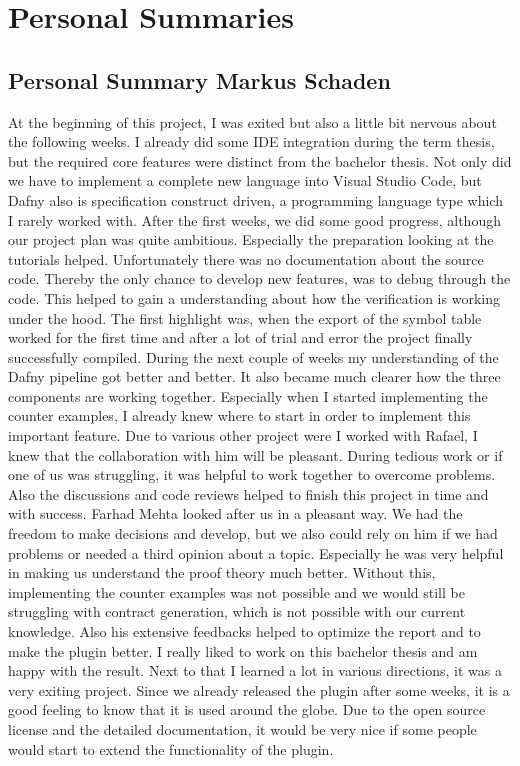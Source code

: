 \section{Personal Summaries}

\subsection{Personal Summary Markus Schaden}
At the beginning of this project, I was exited but also a little bit nervous about the following weeks. I already did some IDE integration during the term thesis, but the required core features were distinct from the bachelor thesis. Not only did we have to implement a complete new language into Visual Studio Code, but Dafny also is specification construct driven, a programming language type which I rarely worked with. \newline
After the first weeks, we did some good progress, although our project plan was quite ambitious. Especially the preparation looking at the tutorials helped. Unfortunately there was no documentation about the source code. Thereby the only chance to develop new features, was to debug through the code. This helped to gain a understanding about how the verification is working under the hood. The first highlight was, when the export of the symbol table worked for the first time and after a lot of trial and error the project finally successfully compiled.  \newline
During the next couple of weeks my understanding of the Dafny pipeline got better and better. It also became much clearer how the three components are working together. Especially when I started implementing the counter examples, I already knew where to start in order to implement this important feature.  \newline
Due to various other project were I worked with Rafael, I knew that the collaboration with him will be pleasant. During tedious work or if one of us was struggling, it was helpful to work together to overcome problems. Also the discussions and code reviews helped to finish this project in time and with success.   \newline
Farhad Mehta looked after us in a pleasant way. We had the freedom to make decisions and develop, but we also could rely on him if we had problems or needed a third opinion about a topic. Especially he was very helpful in making us understand the proof theory much better. Without this, implementing the counter examples was not possible and we would still be struggling with contract generation, which is not possible with our current knowledge. Also his extensive feedbacks helped to optimize the report and to make the plugin better.  \newline
I really liked to work on this bachelor thesis and am happy with the result. Next to that I learned a lot in various directions, it was a very exiting project. Since we already released the plugin after some weeks, it is a good feeling to know that it is used around the globe. Due to the open source license and the detailed documentation, it would be very nice if some people would start to extend the functionality of the plugin.   \newline
\clearpage
